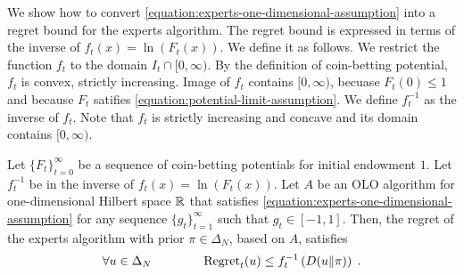 We show how to convert \eqref{equation:experts-one-dimensional-assumption} into
a regret bound for the experts algorithm. The regret bound is expressed in terms
of the inverse of $f_t(x) = \ln(F_t(x))$. We define it as follows. We
restrict the function $f_t$ to the domain $I_t \cap [0, \infty)$. By the
definition of coin-betting potential, $f_t$ is convex, strictly increasing.
Image of $f_t$ contains $[0,\infty)$, becuase $F_t(0) \le 1$ and because $F_t$
satifies \eqref{equation:potential-limit-assumption}. We define $f_t^{-1}$ as
the inverse of $f_t$. Note that $f_t$ is strictly increasing and concave and its
domain contains $[0, \infty)$.

\begin{theorem}
\label{theorem:regret-bound-experts}
Let $\{F_t\}_{t=0}^\infty$ be a sequence of coin-betting potentials for initial
endowment $1$. Let $f_t^{-1}$ be in the inverse of $f_t(x) = \ln(F_t(x))$.
Let $A$ be an OLO algorithm for one-dimensional Hilbert space
$\mathbb{R}$ that satisfies \eqref{equation:experts-one-dimensional-assumption} for any
sequence $\{g_t\}_{t=1}^\infty$ such that $g_t \in [-1,1]$. Then, the regret of
the experts algorithm with prior $\pi \in \Delta_N$, based on $A$, satisfies
$$
\forall u \in \Delta_N \qquad \qquad
\operatorname{Regret}_t(u) \le f_t^{-1}\left( D({u}\|{\pi}) \right) \; .
$$
\end{theorem}

